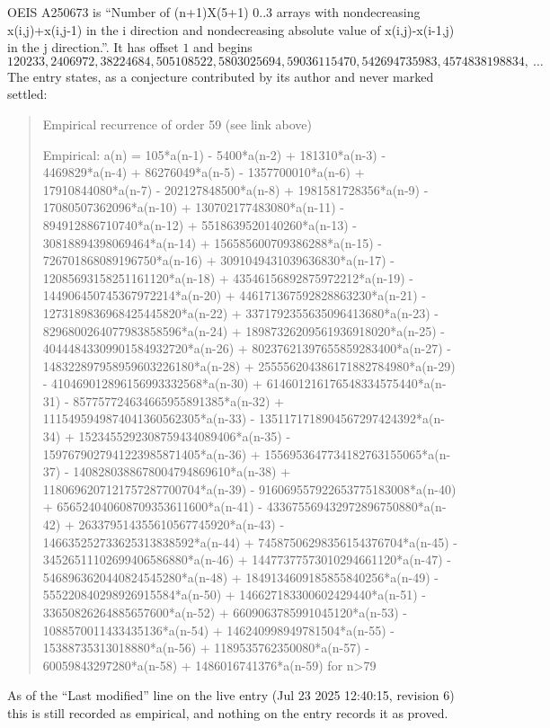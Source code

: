\documentclass[11pt,a4paper]{article}
\theoremstyle{plain}
\theoremstyle{definition}
\begin{document}
OEIS A250673 is ``Number of (n+1)X(5+1) 0..3 arrays with nondecreasing x(i,j)+x(i,j-1) in the i direction and nondecreasing absolute value of x(i,j)-x(i-1,j) in the j direction.''. It has offset $1$ and begins
\[
120233, 2406972, 38224684, 505108522, 5803025694, 59036115470, 542694735983, 4574838198834,\ \dots
\]
The entry states, as a conjecture contributed by its author and never marked settled:
\begin{quote}\raggedright\small
Empirical recurrence of order 59 (see link above)

Empirical: a(n) = 105*a(n-1) - 5400*a(n-2) + 181310*a(n-3) - 4469829*a(n-4) + 86276049*a(n-5) - 1357700010*a(n-6) + 17910844080*a(n-7) - 202127848500*a(n-8) + 1981581728356*a(n-9) - 17080507362096*a(n-10) + 130702177483080*a(n-11) - 894912886710740*a(n-12) + 5518639520140260*a(n-13) - 30818894398069464*a(n-14) + 156585600709386288*a(n-15) - 726701868089196750*a(n-16) + 3091049431039636830*a(n-17) - 12085693158251161120*a(n-18) + 43546156892875972212*a(n-19) - 144906450745367972214*a(n-20) + 446171367592828863230*a(n-21) - 1273189836968425445820*a(n-22) + 3371792355635096413680*a(n-23) - 8296800264077983858596*a(n-24) + 18987326209561936918020*a(n-25) - 40444843309901584932720*a(n-26) + 80237621397655859283400*a(n-27) - 148322897958959603226180*a(n-28) + 255556204386171882784980*a(n-29) - 410469012896156993332568*a(n-30) + 614601216176548334575440*a(n-31) - 857757724634665955891385*a(n-32) + 1115495949874041360562305*a(n-33) - 1351171718904567297424392*a(n-34) + 1523455292308759434089406*a(n-35) - 1597679027941223985871405*a(n-36) + 1556953647734182763155065*a(n-37) - 1408280388678004794869610*a(n-38) + 1180696207121757287700704*a(n-39) - 916069557922653775183008*a(n-40) + 656524040608709353611600*a(n-41) - 433675569432972896750880*a(n-42) + 263379514355610567745920*a(n-43) - 146635252733625313838592*a(n-44) + 74587506298356154376704*a(n-45) - 34526511102699406586880*a(n-46) + 14477377573010294661120*a(n-47) - 5468963620440824545280*a(n-48) + 1849134609185855840256*a(n-49) - 555220840298926915584*a(n-50) + 146627183300602429440*a(n-51) - 33650826264885657600*a(n-52) + 6609063785991045120*a(n-53) - 1088570011433435136*a(n-54) + 146240998949781504*a(n-55) - 15388735313018880*a(n-56) + 1189535762350080*a(n-57) - 60059843297280*a(n-58) + 1486016741376*a(n-59) for n>79
\end{quote}
As of the ``Last modified'' line on the live entry (Jul 23 2025 12:40:15, revision 6) this is still
recorded as empirical, and nothing on the entry records it as proved.
\end{document}
